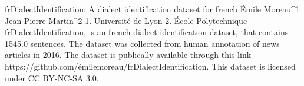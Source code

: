 
frDialectIdentification: A dialect identification dataset for french
Émile Moreau^1 Jean-Pierre Martin^2
1. Université de Lyon 2. École Polytechnique
frDialectIdentification, is an french dialect identification dataset, that contains 1545.0 sentences.
The dataset was collected from human annotation of news articles in 2016. 
The dataset is publically available through this link https://github.com/émilemoreau/frDialectIdentification. This dataset is licensed under CC BY-NC-SA 3.0.

